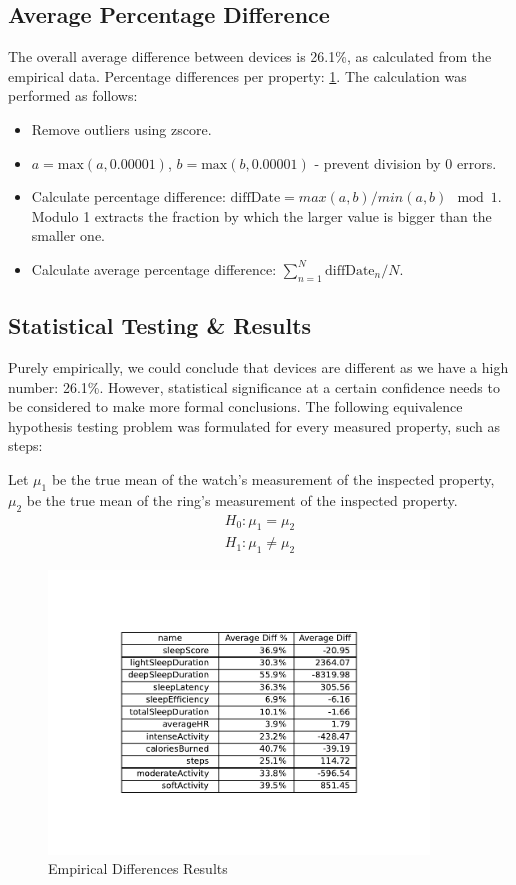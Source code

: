 \subsection{Average Percentage Difference}
The overall average difference between devices is 26.1\%, as calculated from the empirical data. Percentage differences per property: \ref{fig:empirical}. The calculation was performed as follows: 
\begin{itemize}
    \item Remove outliers using zscore.
    \item $a = \text{max}(a, 0.00001)$, $b = \text{max}(b, 0.00001)$ - prevent division by 0 errors.
    \item Calculate percentage difference: $\text{diffDate} = max(a,b) / min(a,b) \mod 1$. Modulo 1 extracts the fraction by which the larger value is bigger than the smaller one.
    \item Calculate average percentage difference: $\sum_{n=1}^{N} \text{diffDate}_n / N$.
\end{itemize}
\subsection{Statistical Testing \& Results}
Purely empirically, we could conclude that devices are different as we have a high number: 26.1\%. However, statistical significance at a certain confidence needs to be considered to make more formal conclusions. The following equivalence hypothesis testing problem was formulated for every measured property, such as steps: 

Let $\mu_1$ be the true mean of the watch's measurement of the inspected property, $\mu_2$ be the true mean of the ring's measurement of the inspected property.
\begin{align*}
    H_0:\mu_1 = \mu_2 \\
    H_1: \mu_1 \neq \mu_2
\end{align*}
\begin{figure}
    
    \centering
    \includegraphics[width=0.9\textwidth,keepaspectratio]{../images/empiricalResults.pdf}
    \caption{Empirical Differences Results}
    \label{fig:empirical}
    
\end{figure}

